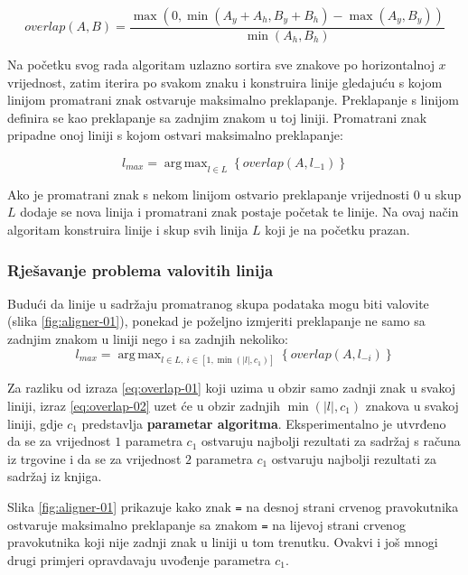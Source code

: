 \documentclass[times, utf8, zavrsni]{fer}
\DeclareMathOperator*{\argmax}{arg\,max}
\begin{document}
\begin{equation}
\label{eq:overlap}
\textit{overlap}(A, B) =
\frac{\max(0, \min( A_y + A_h, B_y + B_h ) - \max( A_y, B_y ))}{\min(A_h, B_h)}
\end{equation}

Na početku svog rada algoritam uzlazno sortira sve znakove po horizontalnoj $x$
vrijednost, zatim iterira po svakom znaku i konstruira linije gledajuću s kojom
linijom promatrani znak ostvaruje maksimalno preklapanje. Preklapanje s linijom
definira se kao preklapanje sa zadnjim znakom u toj liniji. Promatrani znak
pripadne onoj liniji s kojom ostvari maksimalno preklapanje:

\begin{equation}
\label{eq:overlap-01}
l_{max} = \argmax_{l \in L}\left\{\textit{overlap}(A, l_{-1})\right\}
\end{equation}

Ako je promatrani znak s nekom linijom ostvario preklapanje vrijednosti $0$
u skup $L$ dodaje se nova linija i promatrani znak postaje početak te linije.
Na ovaj način algoritam konstruira linije i skup svih linija $L$ koji je na
početku prazan.


\subsubsection{Rješavanje problema valovitih linija}
Budući da linije u sadržaju promatranog skupa podataka mogu biti valovite
(slika \ref{fig:aligner-01}), ponekad je poželjno izmjeriti preklapanje ne samo
sa zadnjim znakom u liniji nego i sa zadnjih nekoliko:
\begin{equation}
\label{eq:overlap-02}
l_{max} = \argmax_{l \in L,\ i \in [1, \min(|l|, c_1)]}\left\{\textit{overlap}(A, l_{-i})\right\}
\end{equation}

Za razliku od izraza \ref{eq:overlap-01} koji uzima u obzir samo zadnji znak u
svakoj liniji, izraz \ref{eq:overlap-02} uzet će u obzir zadnjih
$\min(|l|, c_1)$
znakova u svakoj liniji, gdje $c_1$ predstavlja \textbf{parametar algoritma}. Eksperimentalno je utvrđeno da se za vrijednost $1$ parametra $c_1$ ostvaruju najbolji rezultati za sadržaj s računa iz trgovine i da se za vrijednost $2$ parametra $c_1$ ostvaruju najbolji rezultati za sadržaj iz knjiga.

Slika \ref{fig:aligner-01} prikazuje kako znak \lstinline{=} na desnoj strani
crvenog pravokutnika ostvaruje maksimalno preklapanje sa znakom \lstinline{=}
na lijevoj strani crvenog pravokutnika koji nije zadnji znak u liniji u tom
trenutku. Ovakvi i još mnogi drugi primjeri opravdavaju uvođenje parametra
$c_1$.
\end{document}
